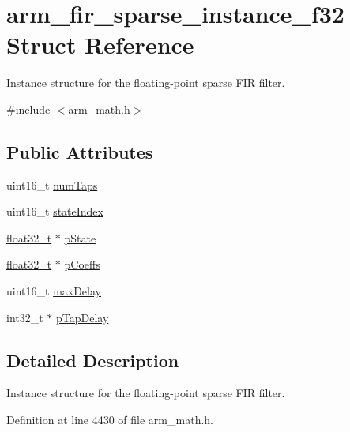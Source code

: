 \hypertarget{structarm__fir__sparse__instance__f32}{}\section{arm\+\_\+fir\+\_\+sparse\+\_\+instance\+\_\+f32 Struct Reference}
\label{structarm__fir__sparse__instance__f32}


Instance structure for the floating-\/point sparse F\+IR filter.  




{\ttfamily \#include $<$arm\+\_\+math.\+h$>$}

\subsection*{Public Attributes}
\begin{DoxyCompactItemize}
\item 
uint16\+\_\+t \hyperlink{structarm__fir__sparse__instance__f32_a5e19e7f234ac30a3db843352bf2a8515}{num\+Taps}
\item 
uint16\+\_\+t \hyperlink{structarm__fir__sparse__instance__f32_a57585aeca9dc8686e08df2865375a86d}{state\+Index}
\item 
\hyperlink{arm__math_8h_a4611b605e45ab401f02cab15c5e38715}{float32\+\_\+t} $\ast$ \hyperlink{structarm__fir__sparse__instance__f32_a794af0916666d11cc564d6df08553555}{p\+State}
\item 
\hyperlink{arm__math_8h_a4611b605e45ab401f02cab15c5e38715}{float32\+\_\+t} $\ast$ \hyperlink{structarm__fir__sparse__instance__f32_a04af7c738dfb0882ad102fcad501d94a}{p\+Coeffs}
\item 
uint16\+\_\+t \hyperlink{structarm__fir__sparse__instance__f32_af8b8c775f4084c36774f06c082b4c078}{max\+Delay}
\item 
int32\+\_\+t $\ast$ \hyperlink{structarm__fir__sparse__instance__f32_aaa54ae67e5d10c6dd0d697945c638d31}{p\+Tap\+Delay}
\end{DoxyCompactItemize}


\subsection{Detailed Description}
Instance structure for the floating-\/point sparse F\+IR filter. 

Definition at line 4430 of file arm\+\_\+math.\+h.




